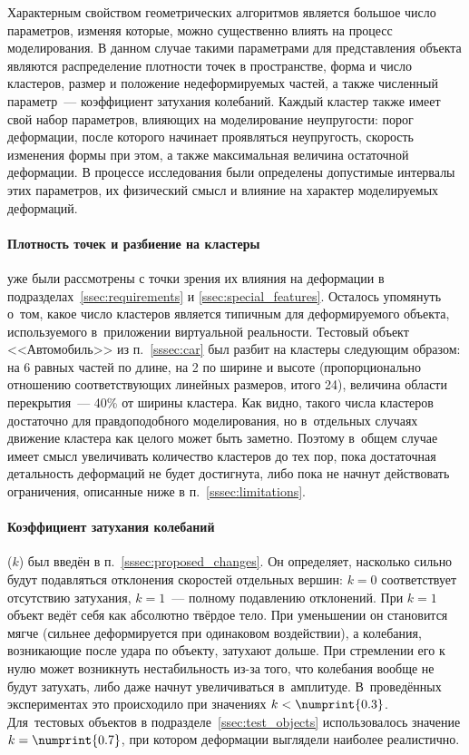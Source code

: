 \documentclass[a4paper, 14pt, titlepage]{extarticle}
\newcommand{\num}[1]{\numprint{#1}}
\begin{document}
      Характерным свойством геометрических алгоритмов является большое число параметров, изменяя
      которые, можно существенно влиять на процесс моделирования.  В данном случае такими
      параметрами для представления объекта являются распределение плотности точек в
      пространстве, форма и число кластеров, размер и положение недеформируемых частей, а также
      численный параметр~--- коэффициент затухания колебаний. Каждый кластер также имеет свой набор
      параметров, влияющих на моделирование неупругости: порог деформации, после которого начинает
      проявляться неупругость, скорость изменения формы при этом, а также максимальная величина
      остаточной деформации. В процессе исследования были определены допустимые интервалы этих
      параметров, их физический смысл и влияние на характер моделируемых деформаций.

      \paragraph{Плотность точек и разбиение на кластеры} уже были рассмотрены с точки зрения
      их влияния на деформации в подразделах~\ref{ssec:requirements} и \ref{ssec:special_features}.
      Осталось упомянуть о~том, какое число кластеров является типичным для
      деформируемого объекта, используемого в~приложении виртуальной реальности. Тестовый
      объект <<Автомобиль>> из п.~\ref{sssec:car} был разбит на кластеры следующим образом: на 6
      равных частей по длине, на 2 по ширине и высоте (пропорционально отношению соответствующих
      линейных размеров, итого 24), величина области перекрытия~--- 40\% от ширины кластера.
      Как видно, такого числа кластеров достаточно для правдоподобного моделирования, но
      в~отдельных случаях движение кластера как целого может быть заметно. Поэтому в~общем случае
      имеет смысл увеличивать количество кластеров до тех пор, пока достаточная детальность
      деформаций не будет достигнута, либо пока не начнут действовать ограничения, описанные ниже в
      п.~\ref{sssec:limitations}.

      \paragraph{Коэффициент затухания колебаний} ($k$) был введён в п.~\ref{sssec:proposed_changes}.
      Он определяет, насколько сильно будут подавляться отклонения скоростей отдельных вершин: $k = 0$
      соответствует отсутствию затухания, $k = 1$~--- полному подавлению отклонений. При $k = 1$
      объект ведёт себя как абсолютно твёрдое тело. При уменьшении он становится мягче (сильнее
      деформируется при одинаковом воздействии), а колебания, возникающие после удара по объекту,
      затухают дольше. При стремлении его к нулю может возникнуть нестабильность из-за того, что
      колебания вообще не будут затухать, либо даже начнут увеличиваться в~амплитуде. В~проведённых
      экспериментах это происходило при значениях $k < \num{0.3}$. Для~тестовых объектов
      в подразделе~\ref{ssec:test_objects} использовалось значение $k = \num{0.7}$, при котором деформации
      выглядели наиболее реалистично.
\end{document}
